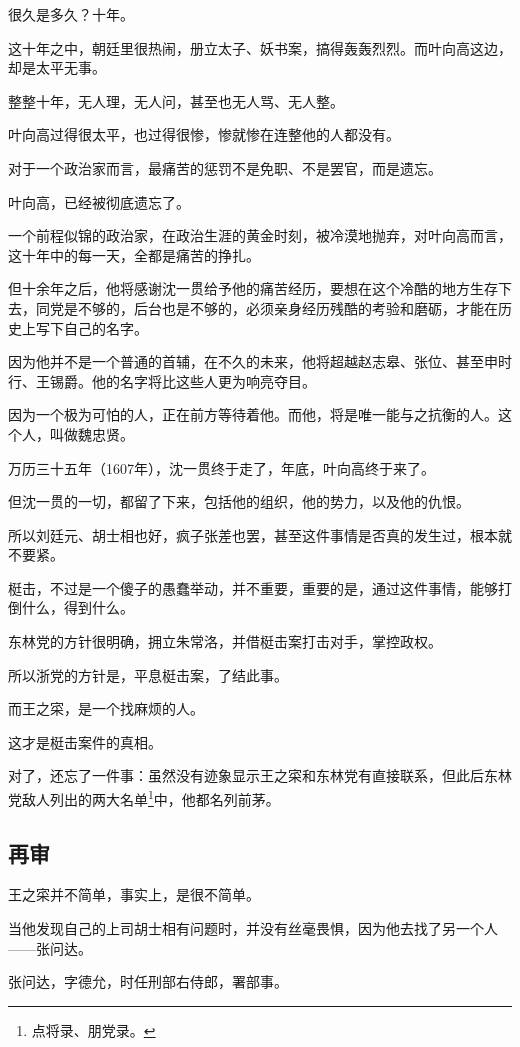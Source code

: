 \begin{multicols}{\theparacolNo}
很久是多久？十年。

这十年之中，朝廷里很热闹，册立太子、妖书案，搞得轰轰烈烈。而叶向高这边，却是太平无事。

整整十年，无人理，无人问，甚至也无人骂、无人整。

叶向高过得很太平，也过得很惨，惨就惨在连整他的人都没有。

对于一个政治家而言，最痛苦的惩罚不是免职、不是罢官，而是遗忘。

叶向高，已经被彻底遗忘了。

一个前程似锦的政治家，在政治生涯的黄金时刻，被冷漠地抛弃，对叶向高而言，这十年中的每一天，全都是痛苦的挣扎。

但十余年之后，他将感谢沈一贯给予他的痛苦经历，要想在这个冷酷的地方生存下去，同党是不够的，后台也是不够的，必须亲身经历残酷的考验和磨砺，才能在历史上写下自己的名字。

因为他并不是一个普通的首辅，在不久的未来，他将超越赵志皋、张位、甚至申时行、王锡爵。他的名字将比这些人更为响亮夺目。

因为一个极为可怕的人，正在前方等待着他。而他，将是唯一能与之抗衡的人。这个人，叫做魏忠贤。

万历三十五年（1607年），沈一贯终于走了，年底，叶向高终于来了。

但沈一贯的一切，都留了下来，包括他的组织，他的势力，以及他的仇恨。

所以刘廷元、胡士相也好，疯子张差也罢，甚至这件事情是否真的发生过，根本就不要紧。

梃击，不过是一个傻子的愚蠢举动，并不重要，重要的是，通过这件事情，能够打倒什么，得到什么。

东林党的方针很明确，拥立朱常洛，并借梃击案打击对手，掌控政权。

所以浙党的方针是，平息梃击案，了结此事。

而王之寀，是一个找麻烦的人。

这才是梃击案件的真相。

对了，还忘了一件事：虽然没有迹象显示王之寀和东林党有直接联系，但此后东林党敌人列出的两大名单\footnote{点将录、朋党录。}中，他都名列前茅。

\subsection{再审}
王之寀并不简单，事实上，是很不简单。

当他发现自己的上司胡士相有问题时，并没有丝毫畏惧，因为他去找了另一个人——张问达。

张问达，字德允，时任刑部右侍郎，署部事。


\end{multicols}
